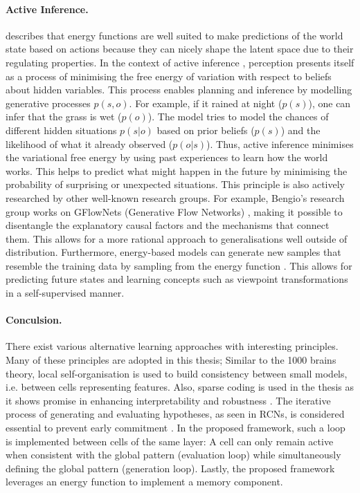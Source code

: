 \paragraph{Active Inference.}  describes that energy functions are well suited to make predictions of the world state based on actions because they can nicely shape the latent space due to their regulating properties.
In the context of active inference , perception presents itself as a process of minimising the free energy of variation with respect to beliefs about hidden variables. This process enables planning and inference by modelling generative processes $p(s,o)$. For example, if it rained at night ($p(s)$), one can infer that the grass is wet ($p(o)$). The model tries to model the chances of different hidden situations $p(s|o)$ based on prior beliefs ($p(s)$) and the likelihood of what it already observed ($p(o|s)$). 
Thus, active inference minimises the variational free energy by using past experiences to learn how the world works. This helps to predict what might happen in the future by minimising the probability of surprising or unexpected situations.
This principle is also actively researched by other well-known research groups. For example, Bengio's research group works on GFlowNets (Generative Flow Networks) , making it possible to disentangle the explanatory causal factors and the mechanisms that connect them. This allows for a more rational approach to generalisations well outside of distribution.
Furthermore, energy-based models can generate new samples that resemble the training data by sampling from the energy function . This allows for predicting future states and learning concepts such as viewpoint transformations in a self-supervised manner.

\paragraph{Conculsion.} There exist various alternative learning approaches with interesting principles. Many of these principles are adopted in this thesis; Similar to the 1000 brains theory, local self-organisation is used to build consistency between small models, i.e. between cells representing features.
Also, sparse coding is used in the thesis as it shows promise in enhancing interpretability and robustness . The iterative process of generating and evaluating hypotheses, as seen in RCNs, is considered essential to prevent early commitment . In the proposed framework, such a loop is implemented between cells of the same layer: A cell can only remain active when consistent with the global pattern (evaluation loop) while simultaneously defining the global pattern (generation loop). Lastly, the proposed framework leverages an energy function to implement a memory component. 

